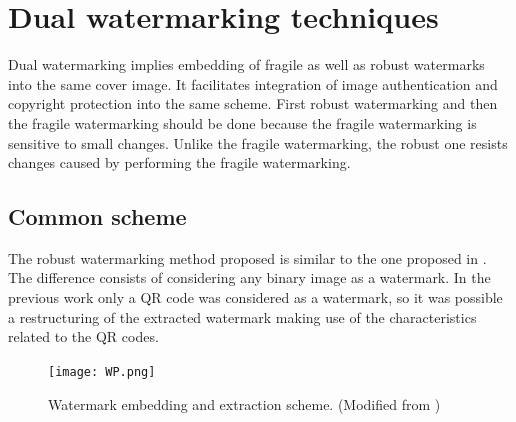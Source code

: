\documentclass[runningheads]{llncs}
\begin{document}
\section{Dual watermarking techniques}
Dual watermarking implies embedding of fragile as well as robust watermarks into the same cover image. It facilitates integration of image authentication and copyright protection into the same scheme. First robust watermarking and then the fragile watermarking should be done because the fragile watermarking is sensitive to small changes. Unlike the fragile watermarking, the robust one resists changes caused by performing the fragile watermarking.

\subsection{Common scheme}
The robust watermarking method proposed is similar to the one proposed in \cite{avila2018watermarking}. The difference consists of considering any binary image as a watermark. In the previous work only a QR code was considered as a watermark, so it was possible a restructuring of the extracted watermark making use of the characteristics related to the QR codes.
\begin{figure}
	\begin{center}
		\texttt{[image: WP.png]}
	\end{center}
	\caption{Watermark embedding and extraction scheme. (Modified from \cite{avila2018watermarking})}
	\label{PIE}
\end{figure}
\end{document}
